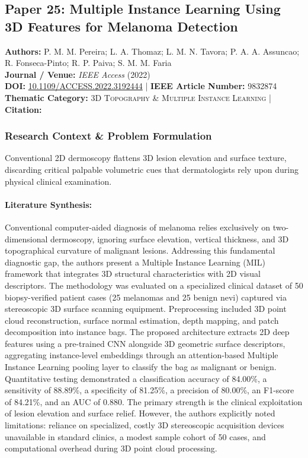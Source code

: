 \subsection{Paper 25: Multiple Instance Learning Using 3D Features for Melanoma Detection}
\label{sec:paper_25}

\begin{tcolorbox}[colback=gray!5!white,colframe=gray!75!black,title=\textbf{Metadata \& Citation Summary}]
\textbf{Authors:} P. M. M. Pereira; L. A. Thomaz; L. M. N. Tavora; P. A. A. Assuncao; R. Fonseca-Pinto; R. P. Paiva; S. M. M. Faria \\
\textbf{Journal / Venue:} \textit{IEEE Access} (2022) \\
\textbf{DOI:} \href{https://doi.org/10.1109/ACCESS.2022.3192444}{10.1109/ACCESS.2022.3192444} \quad | \quad \textbf{IEEE Article Number:} 9832874 \\
\textbf{Thematic Category:} \textsc{3D Topography \& Multiple Instance Learning} \quad | \quad \textbf{Citation:} \cite{9832874}
\end{tcolorbox}

\subsubsection*{Research Context \& Problem Formulation}
Conventional 2D dermoscopy flattens 3D lesion elevation and surface texture, discarding critical palpable volumetric cues that dermatologists rely upon during physical clinical examination.

\paragraph{Literature Synthesis:} Conventional computer-aided diagnosis of melanoma relies exclusively on two-dimensional dermoscopy, ignoring surface elevation, vertical thickness, and 3D topographical curvature of malignant lesions. Addressing this fundamental diagnostic gap, the authors present a Multiple Instance Learning (MIL) framework that integrates 3D structural characteristics with 2D visual descriptors. The methodology was evaluated on a specialized clinical dataset of 50 biopsy-verified patient cases (25 melanomas and 25 benign nevi) captured via stereoscopic 3D surface scanning equipment. Preprocessing included 3D point cloud reconstruction, surface normal estimation, depth mapping, and patch decomposition into instance bags. The proposed architecture extracts 2D deep features using a pre-trained CNN alongside 3D geometric surface descriptors, aggregating instance-level embeddings through an attention-based Multiple Instance Learning pooling layer to classify the bag as malignant or benign. Quantitative testing demonstrated a classification accuracy of 84.00\%, a sensitivity of 88.89\%, a specificity of 81.25\%, a precision of 80.00\%, an F1-score of 84.21\%, and an AUC of 0.880. The primary strength is the clinical exploitation of lesion elevation and surface relief. However, the authors explicitly noted limitations: reliance on specialized, costly 3D stereoscopic acquisition devices unavailable in standard clinics, a modest sample cohort of 50 cases, and computational overhead during 3D point cloud processing.

